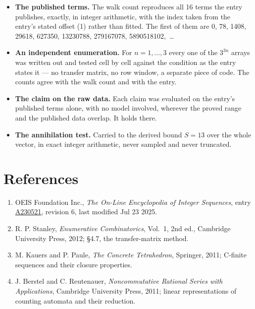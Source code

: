 \documentclass[11pt]{article}
\theoremstyle{definition}
\begin{document}
\begin{itemize}

\item {\bfseries The published terms.} The walk count reproduces all 16 terms the entry publishes, exactly, in integer arithmetic, with the index taken from the entry's stated offset (1) rather than fitted. The first of them are 0, 78, 1408, 29618, 627350, 13230788, 279167078, 5890518102,~\dots

\item {\bfseries An independent enumeration.} For $n = 1,\dots,3$ every one of the $3^{3n}$ arrays was written out and tested cell by cell against the condition as the entry states it --- no transfer matrix, no row window, a separate piece of code. The counts agree with the walk count and with the entry.

\item {\bfseries The claim on the raw data.} Each claim was evaluated on the entry's published terms alone, with no model involved, wherever the proved range and the published data overlap. It holds there.

\item {\bfseries The annihilation test.} Carried to the derived bound $S = 13$ over the whole vector, in exact integer arithmetic, never sampled and never truncated.

\end{itemize}

\section{References}

\begin{enumerate}

\item OEIS Foundation Inc., \emph{The On-Line Encyclopedia of Integer Sequences}, entry \href{https://oeis.org/A230521}{A230521}, revision 6, last modified Jul 23 2025.

\item R. P. Stanley, \emph{Enumerative Combinatorics}, Vol.~1, 2nd ed., Cambridge University Press, 2012; \S4.7, the transfer-matrix method.

\item M. Kauers and P. Paule, \emph{The Concrete Tetrahedron}, Springer, 2011; C-finite sequences and their closure properties.

\item J. Berstel and C. Reutenauer, \emph{Noncommutative Rational Series with Applications}, Cambridge University Press, 2011; linear representations of counting automata and their reduction.

\end{enumerate}
\end{document}
